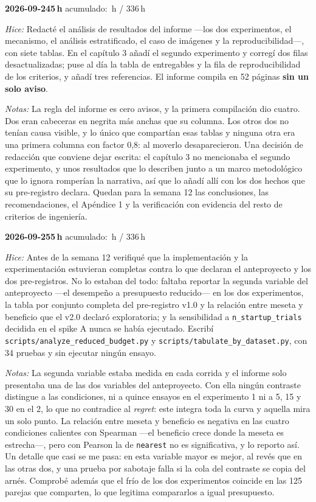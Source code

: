 \documentclass[11pt,letterpaper]{article}
\newcommand{\presupuesto}{336}
\newcommand{\horasacum}{0}
\newcommand{\entrada}[4]{%
  \xdef\horasacum{\fpeval{\horasacum + #2}}%
  \par\medskip
  \noindent\textbf{\color{tecnavy}#1}\quad\textbf{#2\,h}%
  \hfill{\small\color{gris}acumulado: \horasacum\,h / \presupuesto\,h}\par
  \nopagebreak
  \noindent\textit{Hice:} #3\par
  \nopagebreak
  \noindent\textit{Notas:} #4\par
}
\begin{document}
\entrada{2026-09-24}{5}
{Redacté el análisis de resultados del informe ---los dos experimentos, el mecanismo, el
 análisis estratificado, el caso de imágenes y la reproducibilidad---, con siete tablas. En el
 capítulo 3 añadí el segundo experimento y corregí dos filas desactualizadas; puse al día la
 tabla de entregables y la fila de reproducibilidad de los criterios, y añadí tres
 referencias. El informe compila en 52 páginas \textbf{sin un solo aviso}.}
{La regla del informe es cero avisos, y la primera compilación dio cuatro. Dos eran cabeceras
 en negrita más anchas que su columna. Los otros dos no tenían causa visible, y lo único que
 compartían esas tablas y ninguna otra era una primera columna con factor 0,8: al moverlo
 desaparecieron. Una decisión de redacción que conviene dejar escrita: el capítulo 3 no
 mencionaba el segundo experimento, y unos resultados que lo describen junto a un marco
 metodológico que lo ignora romperían la narrativa, así que lo añadí allí con los dos hechos
 que su pre-registro declara. Quedan para la semana 12 las conclusiones, las recomendaciones,
 el Apéndice 1 y la verificación con evidencia del resto de criterios de ingeniería.}

\entrada{2026-09-25}{5}
{Antes de la semana 12 verifiqué que la implementación y la experimentación estuvieran
 completas contra lo que declaran el anteproyecto y los dos pre-registros. No lo estaban del
 todo: faltaba reportar la segunda variable del anteproyecto ---el desempeño a presupuesto
 reducido--- en los dos experimentos, la tabla por conjunto completa del pre-registro v1.0 y
 la relación entre meseta y beneficio que el v2.0 declaró exploratoria; y la sensibilidad a
 \texttt{n\_startup\_trials} decidida en el spike A nunca se había ejecutado. Escribí
 \texttt{scripts/\allowbreak analyze\_\allowbreak reduced\_\allowbreak budget.py} y
 \texttt{scripts/\allowbreak tabulate\_\allowbreak by\_\allowbreak dataset.py}, con 34
 pruebas y sin ejecutar ningún ensayo.}
{La segunda variable estaba medida en cada corrida y el informe solo presentaba una de las dos
 variables del anteproyecto. Con ella ningún contraste distingue a las condiciones, ni a
 quince ensayos en el experimento 1 ni a 5, 15 y 30 en el 2, lo que no contradice al
 \emph{regret}: este integra toda la curva y aquella mira un solo punto. La relación entre
 meseta y beneficio es negativa en las cuatro condiciones calientes con Spearman ---el
 beneficio crece donde la meseta es estrecha---, pero con Pearson la de \texttt{nearest} no es
 significativa, y lo reporto así. Un detalle que casi se me pasa: en esta variable mayor es
 mejor, al revés que en las otras dos, y una prueba por sabotaje falla si la cola del
 contraste se copia del arnés. Comprobé además que el frío de los dos experimentos coincide en
 las 125 parejas que comparten, lo que legitima compararlos a igual presupuesto.}
\end{document}
